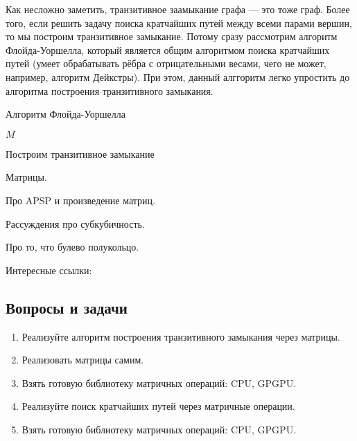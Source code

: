 Как несложно заметить, транзитивное заамыкание графа --- это тоже граф.
Более того, если решить задачу поиска кратчайших путей между всеми парами вершин, то мы построим транзитивное замыкание.
Потому сразу рассмотрим алгоритм Флойда-Уоршелла, который является общим алгоритмом поиска кратчайших путей (умеет обрабатывать рёбра с отрицательными весами, чего не может, например, алгоритм Дейкстры).
При этом, данный алггоритм легко упростить до алгоритма построения транзитивного замыкания.

\begin{algorithm}
\begin{algorithmic}[1]
\caption{Алгоритм Флойда-Уоршелла}
\label{lst:algoFloydWarxhall}
        \EndFor
      \EndFor
    \EndFor
\State \Return $M$
\EndFunction
\end{algorithmic}
\end{algorithm}


\begin{example}
  Построим транзитивное замыкание 
\end{example}



Матрицы.

Про APSP и произведение матриц.

Рассуждения про субкубичность.

Про то, что булево полукольцо.

Интересные ссылки:~\cite{Chan2008} ~\cite{Williams:2010:SEP:1917827.1918339}

\subsection{Вопросы и задачи}
\begin{enumerate}
  \item Реализуйте алгоритм построения транзитивного замыкания через матрицы.
  \item Реализовать матрицы самим.
  \item Взять готовую библиотеку матричных операций: CPU, GPGPU.
  \item Реализуйте поиск кратчайших путей через матричные операции.
  \item Взять готовую библиотеку матричных операций: CPU, GPGPU.
\end{enumerate}
